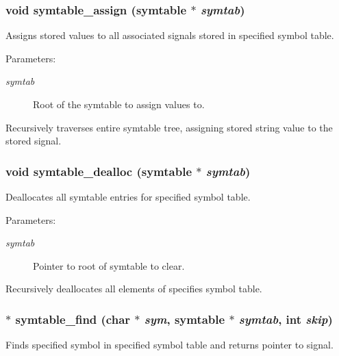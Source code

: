 \subsubsection{\setlength{\rightskip}{0pt plus 5cm}void symtable\_\-assign ({\bf symtable} $\ast$ {\em symtab})}\label{symtable_8c_a2}


Assigns stored values to all associated signals stored in specified symbol table.

\begin{Desc}
\item[Parameters: ]\par
\begin{description}
\item[{\em 
symtab}]Root of the symtable to assign values to.\end{description}
\end{Desc}
Recursively traverses entire symtable tree, assigning stored string value to the stored signal. 
\subsubsection{\setlength{\rightskip}{0pt plus 5cm}void symtable\_\-dealloc ({\bf symtable} $\ast$ {\em symtab})}\label{symtable_8c_a3}


Deallocates all symtable entries for specified symbol table.

\begin{Desc}
\item[Parameters: ]\par
\begin{description}
\item[{\em 
symtab}]Pointer to root of symtable to clear.\end{description}
\end{Desc}
Recursively deallocates all elements of specifies symbol table. 
\subsubsection{$\ast$ symtable\_\-find (char $\ast$ {\em sym}, {\bf symtable} $\ast$ {\em symtab}, int {\em skip})}\label{symtable_8c_a1}


Finds specified symbol in specified symbol table and returns pointer to signal.

